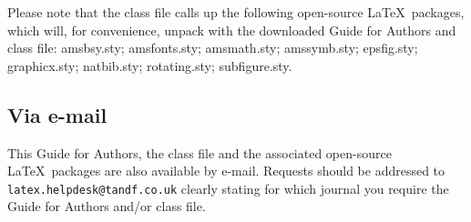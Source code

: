 \documentclass{tADR2e}
\begin{document}
Please note that the class file calls up the following open-source \LaTeX\ packages, which will, for convenience,
unpack with the downloaded Guide for Authors and class file: amsbsy.sty; amsfonts.sty; amsmath.sty; amssymb.sty; epsfig.sty; graphicx.sty; natbib.sty; rotating.sty; subfigure.sty.

\subsection{Via e-mail}

This Guide for Authors, the class file and the associated open-source \LaTeX\ packages are also available by
e-mail. Requests should be addressed to {\tt latex.helpdesk@tandf.co.uk} clearly stating for which journal you
require the Guide for Authors and/or class file.

\label{lastpage}
\end{document}
